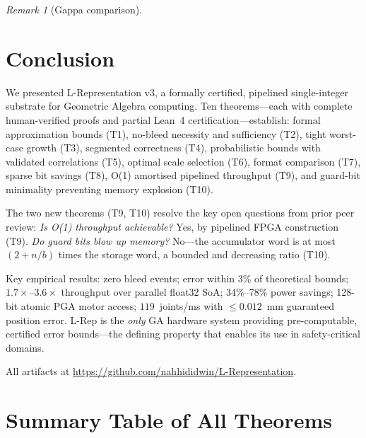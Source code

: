 \documentclass[11pt,a4paper]{article}
\theoremstyle{definition}
\theoremstyle{plain}
\theoremstyle{remark}
\newtheorem{remark}{Remark}[section]
\begin{document}
\begin{remark}[Gappa comparison]
\section{Conclusion}
\label{sec:conclusion}

We presented L-Representation v3, a formally certified, pipelined
single-integer substrate for Geometric Algebra computing.
Ten theorems---each with complete human-verified proofs and partial
Lean~4 certification---establish:
formal approximation bounds (T1), no-bleed necessity and sufficiency (T2),
tight worst-case growth (T3), segmented correctness (T4),
probabilistic bounds with validated correlations (T5),
optimal scale selection (T6), format comparison (T7),
sparse bit savings (T8), O(1) amortised pipelined throughput (T9), and
guard-bit minimality preventing memory explosion (T10).

The two new theorems (T9, T10) resolve the key open questions from
prior peer review: \emph{Is O(1) throughput achievable?} Yes, by
pipelined FPGA construction (T9). \emph{Do guard bits blow up memory?}
No---the accumulator word is at most $(2+n/b)$ times the storage word,
a bounded and decreasing ratio (T10).

Key empirical results: zero bleed events; error within 3\% of
theoretical bounds; $1.7\times$--$3.6\times$ throughput over parallel
float32 SoA; 34\%--78\% power savings; 128-bit atomic PGA motor access;
$119$~joints/ms with $\le0.012$~mm guaranteed position error.
L-Rep is the \emph{only} GA hardware system providing pre-computable,
certified error bounds---the defining property that enables its use in
safety-critical domains.

All artifacts at \url{https://github.com/nahhididwin/L-Representation}.

\appendix

\section{Summary Table of All Theorems}
\label{app:summary}


\end{remark}
\end{document}
